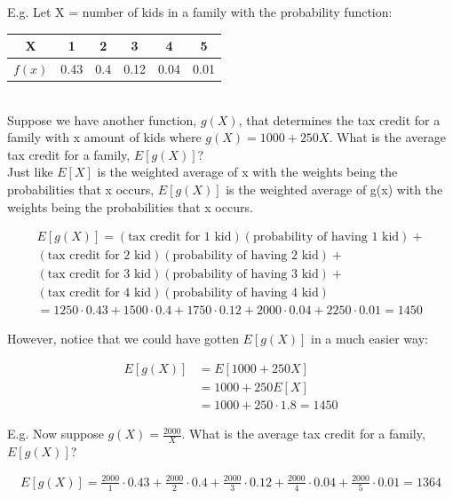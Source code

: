 \documentclass[12pt, letterpaper]{article}
\begin{document}
E.g. Let X = number of kids in a family with the probability function:\\

\begin{tabular}{|c|c|c|c|c|c|}
\hline
X & 1 & 2 & 3 & 4 & 5\\ 
\hline
$f\left(x\right)$ & 0.43 & 0.4 & 0.12 & 0.04 & 0.01\\
\hline
\end{tabular}\\

Suppose we have another function, \(g\left(X\right)\), that determines the tax credit for a family with x amount of kids where \(g\left(X\right) = 1000 + 250X\). What is the average tax credit for a family, \(E[g\left(X\right)]\)?\\

Just like \(E[X]\) is the weighted average of x with the weights being the probabilities that x occurs, \(E[g\left(X\right)]\) is the weighted average of g(x) with the weights being the probabilities that x occurs.

\begin{align*}
E[g\left(X\right)] = (\text{tax credit for 1 kid})(\text{probability of having 1 kid}) + \\
(\text{tax credit for 2 kid})(\text{probability of having 2 kid}) + \\
(\text{tax credit for 3 kid})(\text{probability of having 3 kid}) + \\
(\text{tax credit for 4 kid})(\text{probability of having 4 kid})\\
= 1250 \cdot 0.43 + 1500 \cdot 0.4 + 1750 \cdot 0.12 + 2000 \cdot 0.04 + 2250 \cdot 0.01 = 1450
\end{align*}

However, notice that we could have gotten \(E[g\left(X\right)]\) in a much easier way:

\begin{align*}
E[g\left(X\right)] &= E[1000 + 250X] \\
&= 1000 + 250E[X]\\
&= 1000 + 250 \cdot 1.8 = 1450
\end{align*}

E.g. Now suppose \(g\left(X\right) = \frac{2000}{X}\). What is the average tax credit for a family, \(E[g\left(X\right)]\)?

\begin{align*}
E[g\left(X\right)] = \frac{2000}{1} \cdot 0.43 + \frac{2000}{2} \cdot 0.4 + \frac{2000}{3} \cdot 0.12 + \frac{2000}{4} \cdot 0.04 + \frac{2000}{5} \cdot 0.01 = 1364
\end{align*}
\end{document}
